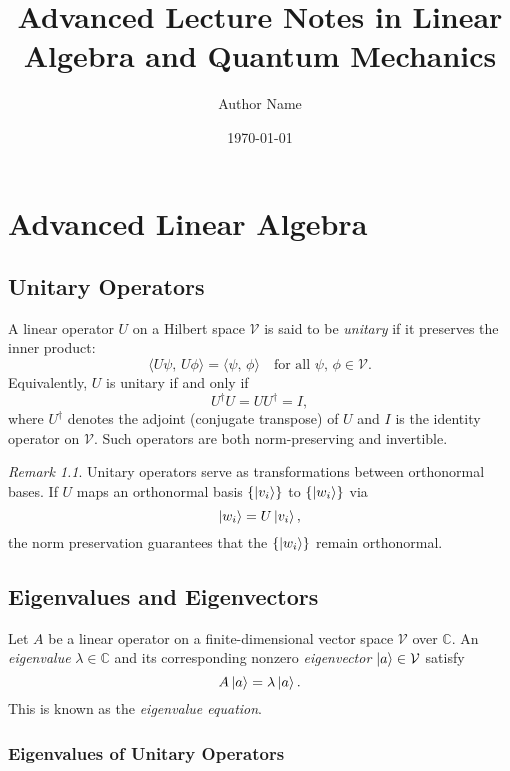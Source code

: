\documentclass[12pt,oneside]{book}
\title{Advanced Lecture Notes in Linear Algebra and Quantum Mechanics}
\author{Author Name}
\date{\today}
\theoremstyle{remark}
\newtheorem{remark}[theorem]{Remark}
\begin{document}
	
	\maketitle
	\tableofcontents
	
	\mainmatter
	
	\chapter{Advanced Linear Algebra}
	
	\section{Unitary Operators}
	
	A linear operator \( U \) on a Hilbert space \( \mathcal{V} \) is said to be \emph{unitary} if it preserves the inner product:
	\[
	\langle U\psi,\, U\phi \rangle = \langle \psi,\, \phi \rangle \quad \text{for all } \psi,\, \phi \in \mathcal{V}.
	\]
	Equivalently, \( U \) is unitary if and only if
	\[
	U^\dagger U = UU^\dagger = I,
	\]
	where \( U^\dagger \) denotes the adjoint (conjugate transpose) of \( U \) and \( I \) is the identity operator on \( \mathcal{V} \). Such operators are both norm-preserving and invertible.
	
	\begin{remark}
		Unitary operators serve as transformations between orthonormal bases. If \( U \) maps an orthonormal basis \( \{\ket{v_i}\} \) to \( \{\ket{w_i}\} \) via 
		\[
		\ket{w_i} = U\ket{v_i},
		\]
		the norm preservation guarantees that the \( \{\ket{w_i}\} \) remain orthonormal.
	\end{remark}
	
	\section{Eigenvalues and Eigenvectors}
	
	Let \( A \) be a linear operator on a finite-dimensional vector space \( \mathcal{V} \) over \( \mathbb{C} \). An \emph{eigenvalue} \( \lambda \in \mathbb{C} \) and its corresponding nonzero \emph{eigenvector} \( \ket{a} \in \mathcal{V} \) satisfy
	\[
	A\ket{a} = \lambda \ket{a}.
	\]
	This is known as the \emph{eigenvalue equation}.
	
	\subsection{Eigenvalues of Unitary Operators}
	
\end{document}

